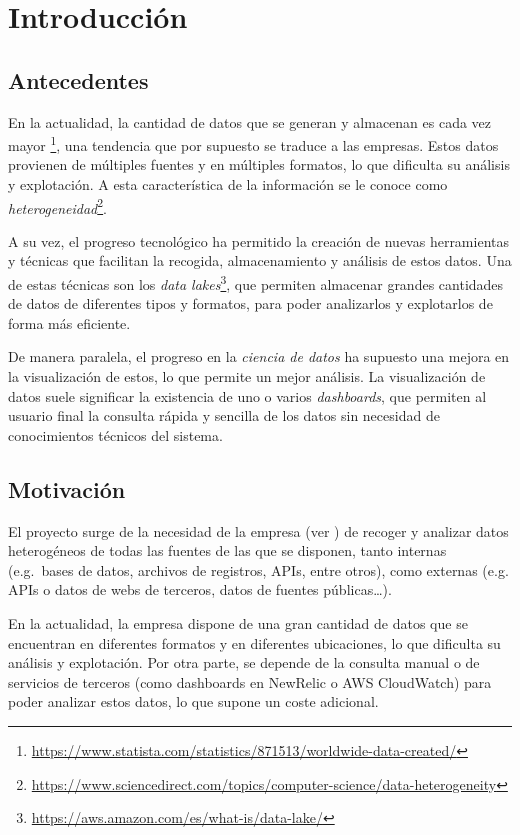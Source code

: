 \chapter{Introducción}\label{chap:intro}
\section{Antecedentes}\label{sec:antecedentes}
En la actualidad, la cantidad de datos que se generan y almacenan es cada vez mayor
\footnote{\url{https://www.statista.com/statistics/871513/worldwide-data-created/}}, una tendencia
que por supuesto se traduce a las empresas. Estos datos provienen de múltiples fuentes y en múltiples
formatos, lo que dificulta su análisis y explotación. A esta característica de la información se le
conoce como \textit{heterogeneidad}\footnote{\url{https://www.sciencedirect.com/topics/computer-science/data-heterogeneity}}.

A su vez, el progreso tecnológico ha permitido la creación de nuevas herramientas y técnicas
que facilitan la recogida, almacenamiento y análisis de estos datos. Una de estas técnicas son
los \textit{data lakes}\footnote{\url{https://aws.amazon.com/es/what-is/data-lake/}},
que permiten almacenar grandes cantidades de datos de diferentes tipos y formatos, para poder
analizarlos y explotarlos de forma más eficiente.

De manera paralela, el progreso en la \textit{ciencia de datos} ha supuesto una mejora en la
visualización de estos, lo que permite un mejor análisis. La visualización de datos suele
significar la existencia de uno o varios \textit{dashboards}\cite{mier2023dashboards}, que
permiten al usuario final la consulta rápida y sencilla de los datos sin necesidad de conocimientos técnicos del sistema.

\section{Motivación}\label{sec:motivacion}
El proyecto surge de la necesidad de la empresa (ver ) de recoger y
analizar datos heterogéneos de todas las fuentes de las que se disponen, tanto internas
(e.g.~bases de datos, archivos de registros, APIs, entre otros), como externas
(e.g. APIs o datos de webs de terceros, datos de fuentes públicas\ldots).

En la actualidad, la empresa dispone de una gran cantidad de datos que se encuentran en
diferentes formatos y en diferentes ubicaciones, lo que dificulta su análisis y explotación.
Por otra parte, se depende de la consulta manual o de servicios de terceros (como dashboards
en NewRelic o AWS CloudWatch) para poder analizar estos datos, lo que supone un coste adicional.

